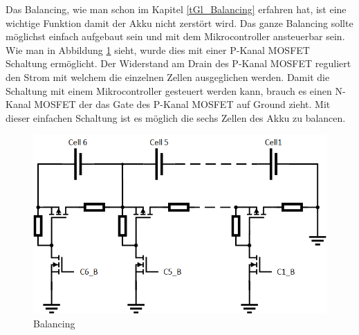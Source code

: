 Das Balancing, wie man schon im Kapitel \ref{tGl_Balancing} erfahren hat, ist eine wichtige Funktion damit der Akku nicht zerstört wird. Das ganze Balancing sollte möglichst einfach aufgebaut sein und mit dem Mikrocontroller ansteuerbar sein. Wie man in Abbildung \ref{fig:Balancing} sieht, wurde dies mit einer P-Kanal MOSFET Schaltung ermöglicht. Der Widerstand am Drain des P-Kanal MOSFET reguliert den Strom mit welchem die einzelnen Zellen ausgeglichen werden. Damit die Schaltung mit einem Mikrocontroller gesteuert werden kann, brauch es einen N-Kanal MOSFET der das Gate des P-Kanal MOSFET auf Ground zieht. Mit dieser einfachen Schaltung ist es möglich die sechs Zellen des Akku zu balancen.

\begin{figure} [H]
	\centering
	\includegraphics[width=0.6\linewidth]{images/Balancing}
	\caption{Balancing}
	\label{fig:Balancing}
\end{figure}


